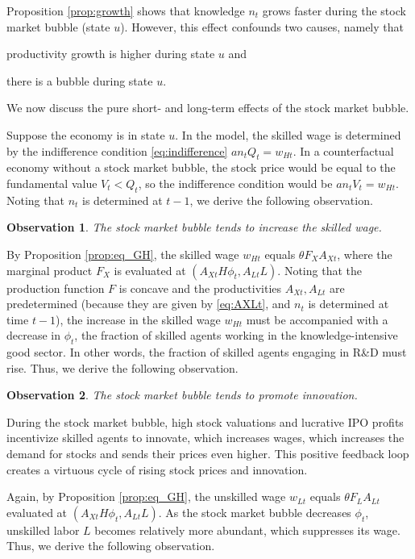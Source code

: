 \documentclass[a4paper,12pt]{article}
\numberwithin{equation}{section}
\theoremstyle{plain}
\newtheorem{obs}{Observation}
\begin{document}
Proposition \ref{prop:growth} shows that knowledge $n_t$ grows faster during the stock market bubble (state $u$). However, this effect confounds two causes, namely that
\begin{enumerate*}
    \item productivity growth is higher during state $u$ and
    \item there is a bubble during state $u$.
\end{enumerate*}
We now discuss the pure short- and long-term effects of the stock market bubble.

Suppose the economy is in state $u$. In the model, the skilled wage is determined by the indifference condition \eqref{eq:indifference} $an_tQ_t=w_{Ht}$. In a counterfactual economy without a stock market bubble, the stock price would be equal to the fundamental value $V_t<Q_t$, so the indifference condition would be $an_tV_t=w_{Ht}$. Noting that $n_t$ is determined at $t-1$, we derive the following observation.

\begin{obs}\label{obs:wH}
The stock market bubble tends to increase the skilled wage.
\end{obs}

By Proposition \ref{prop:eq_GH}, the skilled wage $w_{Ht}$ equals $\theta F_XA_{Xt}$, where the marginal product $F_X$ is evaluated at $(A_{Xt}H\phi_t,A_{Lt}L)$. Noting that the production function $F$ is concave and the productivities $A_{Xt},A_{Lt}$ are predetermined (because they are given by \eqref{eq:AXLt}, and $n_t$ is determined at time $t-1$), the increase in the skilled wage $w_{Ht}$ must be accompanied with a decrease in $\phi_t$, the fraction of skilled agents working in the knowledge-intensive good sector. In other words, the fraction of skilled agents engaging in R\&D must rise. Thus, we derive the following observation.

\begin{obs}\label{obs:innovation}
The stock market bubble tends to promote innovation.
\end{obs}

During the stock market bubble, high stock valuations and lucrative IPO profits incentivize skilled agents to innovate, which increases wages, which increases the demand for stocks and sends their prices even higher. This positive feedback loop creates a virtuous cycle of rising stock prices and innovation.

Again, by Proposition \ref{prop:eq_GH}, the unskilled wage $w_{Lt}$ equals $\theta F_LA_{Lt}$ evaluated at $(A_{Xt}H\phi_t,A_{Lt}L)$. As the stock market bubble decreases $\phi_t$, unskilled labor $L$ becomes relatively more abundant, which suppresses its wage. Thus, we derive the following observation.
\end{document}
